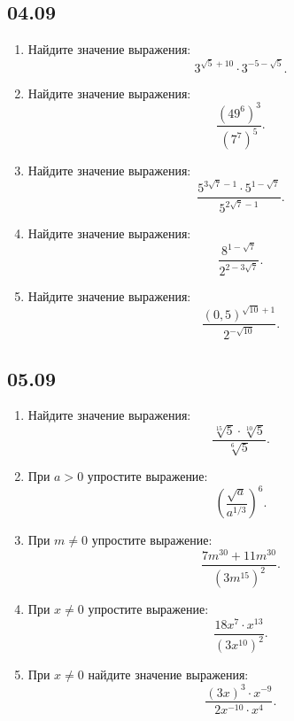 \documentclass[a4paper,12pt]{article}
\begin{document}
\subsection{04.09}

\begin{enumerate}[label=\textbf{\arabic*.}]
  \item Найдите значение выражения:
  \[
  3^{\sqrt5+10}\cdot3^{-5-\sqrt5}.
  \]

  \item Найдите значение выражения:
  \[
  \frac{(49^6)^3}{(7^7)^5}.
  \]

  \item Найдите значение выражения:
  \[
  \frac{
    5^{3\sqrt7-1}\cdot5^{1-\sqrt7}
  }{
    5^{2\sqrt7-1}
  }.
  \]

  \item Найдите значение выражения:
  \[
  \frac{
    8^{1-\sqrt7}
  }{
    2^{2-3\sqrt7}
  }.
  \]

  \item Найдите значение выражения:
  \[
  \frac{
    (0{,}5)^{\sqrt{10}+1}
  }{
    2^{-\sqrt{10}}
  }.
  \]
\end{enumerate}

\subsection{05.09}

\begin{enumerate}[label=\textbf{\arabic*.}]
  \item Найдите значение выражения:
  \[
  \frac{
    \sqrt[15]{5}\cdot\sqrt[10]{5}
  }{
    \sqrt[6]{5}
  }.
  \]

  \item При \(a>0\) упростите выражение:
  \[
  \left(
    \frac{\sqrt a}{a^{1/3}}
  \right)^6.
  \]

  \item При \(m\neq0\) упростите выражение:
  \[
  \frac{
    7m^{30}+11m^{30}
  }{
    (3m^{15})^2
  }.
  \]

  \item При \(x\neq0\) упростите выражение:
  \[
  \frac{
    18x^7\cdot x^{13}
  }{
    (3x^{10})^2
  }.
  \]

  \item При \(x\neq0\) найдите значение выражения:
  \[
  \frac{
    (3x)^3\cdot x^{-9}
  }{
    2x^{-10}\cdot x^4
  }.
  \]
\end{enumerate}
\end{document}
